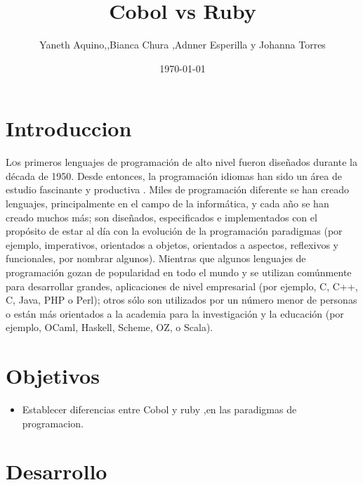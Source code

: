 \documentclass[twoside,twocolumn]{article}
\title{ Cobol vs Ruby} %
\author{Yaneth Aquino,,Bianca Chura ,Adnner Esperilla y Johanna Torres}
\date{\today} %
\begin{document}
\maketitle


\section{Introduccion}

\lettrine[nindent=0em,lines=3]{L}os primeros lenguajes de programación de alto nivel fueron diseñados durante la década de 1950. Desde entonces, la programación
idiomas han sido un área de estudio fascinante y productiva . Miles de programación diferente
se han creado lenguajes, principalmente en el campo de la informática, y cada año se han creado muchos más; son
diseñados, especificados e implementados con el propósito de estar al día con la evolución de la programación
paradigmas (por ejemplo, imperativos, orientados a objetos, orientados a aspectos, reflexivos y funcionales, por nombrar algunos).
Mientras que algunos lenguajes de programación gozan de popularidad en todo el mundo y se utilizan comúnmente para desarrollar grandes,
aplicaciones de nivel empresarial (por ejemplo, C, C++, C, Java, PHP o Perl); otros sólo son utilizados por un número menor de
personas o están más orientados a la academia para la investigación y la educación (por ejemplo, OCaml, Haskell, Scheme, OZ, o
Scala).

\section{Objetivos}
\begin{itemize}
\item Establecer diferencias entre Cobol y ruby ,en las paradigmas de programacion.
\end{itemize}
\section{Desarrollo}
\end{document}
